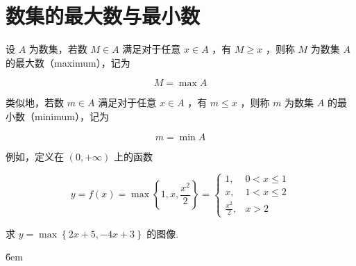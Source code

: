 \section{数集的最大数与最小数}

\begin{example}
    设 $A$ 为数集，若数 $M \in A$ 满足对于任意 $x \in A$ ，有 $M \geq x$ ，则称 $M$ 为数集 $A$ 的最大数（maximum），记为

    $$
        M=\max A
    $$


    类似地，若数 $m \in A$ 满足对于任意 $x \in A$ ，有 $m \leq x$ ，则称 $m$ 为数集 $A$ 的最小数（minimum），记为

    $$
        m=\min A
    $$


    例如，定义在 $(0,+\infty)$ 上的函数

    $$
        y= f(x) =\max \left\{1, x, \frac{x^2}{2}\right\}= \begin{cases}1, & 0<x \leq 1 \\ x, & 1<x \leq 2 \\ \frac{x^2}{2}, & x>2\end{cases}
    $$
\end{example}

\begin{example}
    求 $y = \max \left\{2x+5,-4x+3\right\}$ 的图像.
\end{example}

\v{6em}